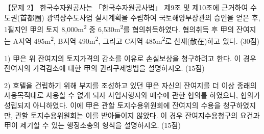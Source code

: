 \begin{longquestion}{【문제 2】}
한국수자원공사는 「한국수자원공사법」 제9조 및 제10조에 근거하여 수도권(首都圈) 광역상수도사업 실시계획을 수립하여 국토해양부장관의 승인을 얻은 후, 1필지인 甲의 토지 8,000m\textsuperscript{2} 중 6,530m\textsuperscript{2}를 협의취득하였다. 협의취득 후 甲의 잔여지는 A지역 495m\textsuperscript{2}, B지역 490m\textsuperscript{2}, 그리고 C지역 485m\textsuperscript{2}로 산재(散在)하고 있다. (30점) \par
1) 甲은 위 잔여지의 토지가격의 감소를 이유로 손실보상을 청구하려고 한다. 이 경우 잔여지의 가격감소에 대한 甲의 권리구제방법을 설명하시오. (15점) \par
2) 호텔을 건립하기 위해 부지를 조성하고 있던 甲은 자신의 잔여지를 더 이상 종래의 사용목적대로 사용할 수 없게 되자 사업시행자와 매수에 관한 협의를 하였으나, 협의가 성립되지 아니하였다. 이에 甲은 관할 토지수용위원회에 잔여지의 수용을 청구하였지만, 관할 토지수용위원회는 이를 받아들이지 않았다. 이 경우 잔여지수용청구의 요건과 甲이 제기할 수 있는 행정소송의 형식을 설명하시오. (15점) \par
\end{longquestion}
